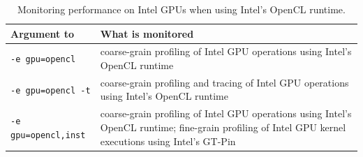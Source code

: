 {
\centering
 \vspace{2ex}
}


\begin{table}[t]
\centering
\begin{tabular}{|l|p{3.5in}|}\hline
Argument to \hpcrun{} & What is monitored\\\hline\hline
{\tt -e gpu=opencl} & coarse-grain profiling of Intel GPU operations using Intel's OpenCL runtime\\\hline
{\tt -e gpu=opencl -t} & coarse-grain profiling and tracing of Intel GPU operations using Intel's OpenCL runtime\\\hline
{\tt -e gpu=opencl,inst} & coarse-grain profiling of Intel GPU operations using Intel's OpenCL runtime;  fine-grain profiling of Intel GPU kernel executions using Intel's GT-Pin \\\hline
\end{tabular}
\caption{Monitoring performance on Intel GPUs when using Intel's OpenCL runtime.}
\label{intel-opencl-options}
\end{table}


